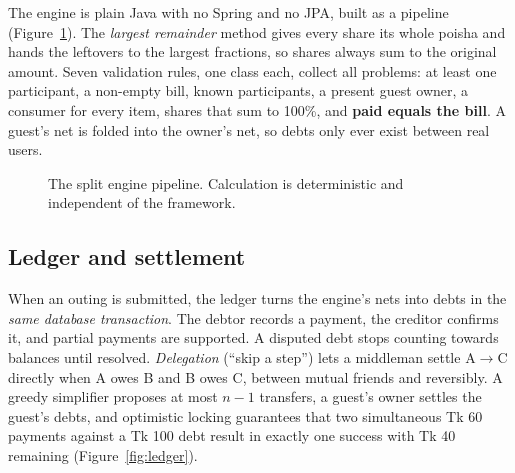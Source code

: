 \documentclass[10pt,a4paper]{article}
\begin{document}
The engine is plain Java with no Spring and no JPA, built as a pipeline (Figure~\ref{fig:pipeline}). The
\emph{largest remainder} method gives every share its whole poisha and hands the leftovers to the largest fractions,
so shares always sum to the original amount. Seven validation rules, one class each, collect all problems: at least
one participant, a non-empty bill, known participants, a present guest owner, a consumer for every item, shares that
sum to 100\%, and \textbf{paid equals the bill}. A guest's net is folded into the owner's net, so debts only ever
exist between real users.

\begin{figure}[h]
\centering
{}
\caption{The split engine pipeline. Calculation is deterministic and independent of the framework.}
\label{fig:pipeline}
\end{figure}

\subsection{Ledger and settlement}

When an outing is submitted, the ledger turns the engine's nets into debts in the \emph{same database transaction}.
The debtor records a payment, the creditor confirms it, and partial payments are supported. A disputed debt stops
counting towards balances until resolved. \emph{Delegation} (``skip a step'') lets a middleman settle A$\rightarrow$C
directly when A owes B and B owes C, between mutual friends and reversibly. A greedy simplifier proposes at most
$n-1$ transfers, a guest's owner settles the guest's debts, and optimistic locking guarantees that two simultaneous
Tk 60 payments against a Tk 100 debt result in exactly one success with Tk 40 remaining
(Figure~\ref{fig:ledger}).
\end{document}
